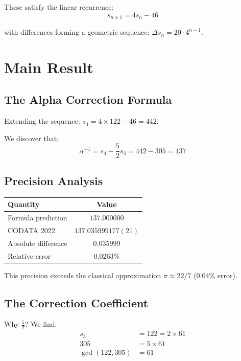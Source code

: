 \documentclass[twocolumn,prl,aps,superscriptaddress]{revtex4-2}
\begin{document}
These satisfy the linear recurrence:
\begin{equation}
s_{n+1} = 4s_n - 46
\end{equation}

with differences forming a geometric sequence: $\Delta s_n = 20 \cdot 4^{n-1}$.

\section{Main Result}

\subsection{The Alpha Correction Formula}

Extending the sequence: $s_4 = 4 \times 122 - 46 = 442$.

We discover that:
\begin{equation}
\boxed{\alpha^{-1} = s_4 - \frac{5}{2}s_3 = 442 - 305 = 137}
\end{equation}

\subsection{Precision Analysis}

\begin{table}[h]
\centering
\begin{tabular}{lc}
\hline
Quantity & Value \\
\hline
Formula prediction & $137.000000$ \\
CODATA 2022 & $137.035999177(21)$ \\
Absolute difference & $0.035999$ \\
Relative error & $0.0263\%$ \\
\hline
\end{tabular}
\end{table}

This precision exceeds the classical approximation $\pi \approx 22/7$ (0.04\% error).

\subsection{The Correction Coefficient}

Why $\frac{5}{2}$? We find:
\begin{align}
s_3 &= 122 = 2 \times 61 \\
305 &= 5 \times 61 \\
\gcd(122, 305) &= 61
\end{align}
\end{document}
